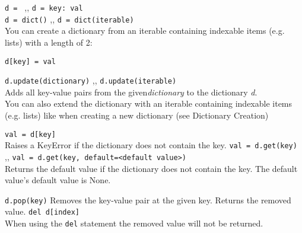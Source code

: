         \begin{itemize}
             \texttt{d = {}} \sep{,}
            \texttt{d = {key: val}} \\
            \texttt{d = dict()} \sep{,} \texttt{d = dict(iterable)} \\
            You can create a dictionary from an iterable containing indexable items (e.g. lists)
            with a length of 2:


             \texttt{d[key] = val}

             \texttt{d.update(dictionary)} \sep{,}
            \texttt{d.update(iterable)} \\
            Adds all key-value pairs from the given\textit{dictionary} to the dictionary
            \textit{d}.\\
            You can also extend the dictionary with an iterable containing indexable items
            (e.g. lists) like when creating a new dictionary (see Dictionary Creation)

            \begin{itemize}
                 \texttt{val = d[key]} \\
                Raises a KeyError if the dictionary does not contain the key.
                 \texttt{val = d.get(key)} \sep{,}
                \texttt{val = d.get(key, default=<default value>)} \\
                Returns the default value if the dictionary does not contain the key.
                The default value's default value is None.
            \end{itemize}

            \begin{itemize}
                 \texttt{d.pop(key)}
                Removes the key-value pair at the given key. Returns the removed value.
                 \texttt{del d[index]} \\
                When using the \texttt{del} statement the removed value will not be
                returned.
            \end{itemize}


\end{itemize}
